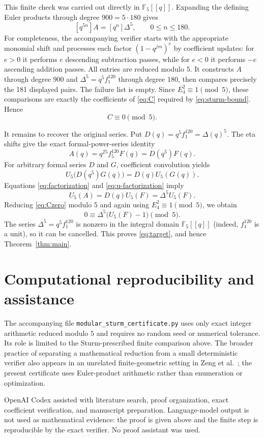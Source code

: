\documentclass[11pt]{article}
\newcommand{\Ffive}{\mathbb F_5}
\begin{document}
This finite check was carried out directly in $\Ffive[[q]]$.  Expanding
the defining Euler products through degree $900=5\cdot180$ gives
\[
 [q^{5n}]A=[q^n]\Delta^5,
 \qquad 0\leq n\leq180.
\]
For completeness, the accompanying verifier starts with the appropriate
monomial shift and processes each factor $(1-q^{jm})^e$ by coefficient
updates: for $e>0$ it performs $e$ descending subtraction passes, while
for $e<0$ it performs $-e$ ascending addition passes.  All entries are
reduced modulo $5$.  It constructs $A$ through degree $900$ and
$\Delta^5=q^5f_1^{120}$ through degree $180$, then compares precisely the
181 displayed pairs.  The failure list is empty.  Since
$E_4^2\equiv1\pmod5$, these comparisons are exactly the coefficients of
\eqref{eq:C} required by \eqref{eq:sturm-bound}.  Hence
\begin{equation}\label{eq:Czero}
 C\equiv0\pmod5.
\end{equation}

It remains to recover the original series.  Put
$D(q)=q^5f_1^{120}=\Delta(q)^5$.  The eta shifts give the exact
formal-power-series identity
\begin{equation}\label{eq:factorization}
 A(q)=q^{25}f_5^{120}F(q)=D(q^5)F(q).
\end{equation}
For arbitrary formal series $D$ and $G$, coefficient convolution yields
\begin{equation}\label{eq:u-factorization}
 U_5\bigl(D(q^5)G(q)\bigr)=D(q)U_5(G(q)).
\end{equation}
Equations \eqref{eq:factorization} and \eqref{eq:u-factorization} imply
\[
 U_5(A)=D(q)U_5(F)=\Delta^5U_5(F).
\]
Reducing \eqref{eq:Czero} modulo $5$ and again using
$E_4^2\equiv1\pmod5$, we obtain
\[
 0\equiv\Delta^5\bigl(U_5(F)-1\bigr)\pmod5.
\]
The series $\Delta^5=q^5f_1^{120}$ is nonzero in the integral domain
$\Ffive[[q]]$ (indeed, $f_1^{120}$ is a unit), so it can be cancelled.
This proves \eqref{eq:target}, and hence Theorem~\ref{thm:main}.

\section*{Computational reproducibility and assistance}

The accompanying file \texttt{modular\_sturm\_certificate.py} uses only
exact integer arithmetic reduced modulo $5$ and requires no random seed or
numerical tolerance.  Its role is limited to the Sturm-prescribed finite
comparison above.  The broader practice of separating a mathematical
reduction from a small deterministic verifier also appears in an unrelated
finite-geometric setting in Zeng et al.~\cite{ZengEtAl2026}; the present
certificate uses Euler-product arithmetic rather than enumeration or
optimization.

OpenAI Codex assisted with literature search, proof organization, exact
coefficient verification, and manuscript preparation.  Language-model
output is not used as mathematical evidence: the proof is given above and
the finite step is reproducible by the exact verifier.  No proof assistant
was used.

\begingroup
\raggedright


\endgroup
\end{document}

